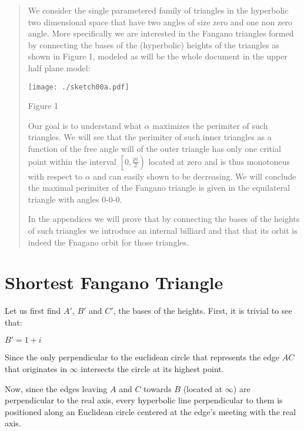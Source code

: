 \documentclass[a4paper,10pt]{article}
\title{}
\author{}
\begin{document}
\maketitle
\begin{abstract}

We consider the single parametered family of triangles in the hyperbolic two 
dimensional space that have two angles of size zero and one non zero angle.
More specifically we are interested in the Fangano triangles formed by connecting 
the bases of the (hyperbolic) heights of the triangles as shown in Figure 1, 
modeled as will be the whole document in the upper half plane model:

\begin{center}
 \texttt{[image: ./sketch00a.pdf]}

 Figure 1
\end{center}

Our goal is to understand what $\alpha$ maximizes the perimiter of such triangles.
We will see that the perimiter of such inner triangles as a function of the free
angle will of the outer triangle has only one critial point within
the interval $\left[0,\frac{pi}{2}\right)$ located at zero and is thus monotoneus
with respect to $\alpha$ and can easily shown to be decreasing. We will conclude
the maximal perimiter of the Fangano triangle is given in the equilateral
triangle with angles 0-0-0.

In the appendices we will prove that by connecting the bases of the heights of
such triangles we introduce an internal billiard and that that its orbit is indeed
the Fnagano orbit for those triangles.

\end{abstract}
\section{Shortest Fangano Triangle}
Let us first find $A'$, $B'$ and $C'$, the bases of the heights. First, it is
trivial to see that:

\begin{center}
$B' = 1 + i$ 
\end{center}

Since the only perpendicular to the euclidean circle that represents the
edge $AC$ that originates in $\infty$ intersects the circle at its highest
point.

Now, since the edges leaving $A$ and $C$ towards $B$ (located at $\infty$) are
perpendicular to the real axis, every hyperbolic line perpendicular to them
is positioned along an Euclidean circle centered at the edge's meeting with the
real axis.
\end{document}
